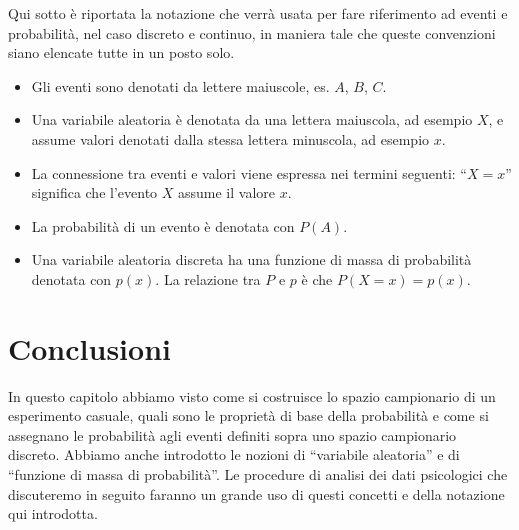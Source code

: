 Qui sotto è riportata la notazione che verrà usata per fare riferimento ad eventi e probabilità, nel caso discreto e continuo, in maniera tale che queste convenzioni siano elencate tutte in un posto solo. 
\begin{itemize}
\item Gli eventi sono denotati da lettere maiuscole, es. $A$, $B$, $C$.
\item Una variabile aleatoria è denotata da una lettera maiuscola, ad esempio $X$, e assume valori denotati dalla stessa lettera minuscola, ad esempio $x$. 
\item La connessione tra eventi e valori viene espressa nei termini seguenti: ``$X = x$'' significa che l'evento $X$ assume il valore $x$.
\item La probabilità di un evento è denotata con $P(A)$.
\item Una variabile aleatoria discreta ha una funzione di massa di probabilità denotata con $p(x)$. 
La relazione tra $P$ e $p$ è che $P(X=x) = p(x)$.
\end{itemize}


\section*{Conclusioni}

In questo capitolo abbiamo visto come si costruisce lo spazio campionario di un esperimento casuale, quali sono le proprietà di base della probabilità e come si assegnano le probabilità agli eventi definiti sopra uno spazio campionario discreto.
Abbiamo anche introdotto le nozioni di \enquote{variabile aleatoria} e di \enquote{funzione di massa di probabilità}. 
Le procedure di analisi dei dati psicologici che discuteremo in seguito faranno un grande uso di questi concetti e della notazione qui introdotta.



